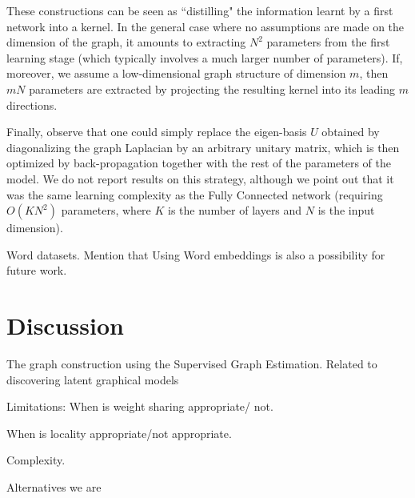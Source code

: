 \documentclass{article} %
\begin{document}
These constructions can be seen as ``distilling" the information learnt by a first network into a kernel. In the general case where no assumptions are made on the dimension of the graph, it amounts to extracting $N^2$ parameters from the first learning stage (which typically involves a much larger number of parameters). If, moreover, we assume a low-dimensional graph structure of dimension $m$, then $m N$ parameters are extracted by projecting the resulting kernel into its leading $m$ directions.

Finally, observe that one could simply replace the eigen-basis $U$ obtained by diagonalizing the graph Laplacian by an arbitrary unitary matrix, which is then optimized by back-propagation together with the rest of the parameters of the model. We do not report results on this strategy, although we point out that it was the same learning complexity as the Fully Connected network (requiring $O(K N^2)$ parameters, where $K$ is the number of layers and $N$ is the input dimension).





Word datasets. Mention that Using Word embeddings is also a possibility for future work.

\section{Discussion}

The graph construction using the Supervised Graph Estimation. 
Related to discovering latent graphical models

Limitations: 
When is weight sharing appropriate/ not. 

When is locality appropriate/not appropriate. 

Complexity.

 Alternatives we are


{}

\end{document}
